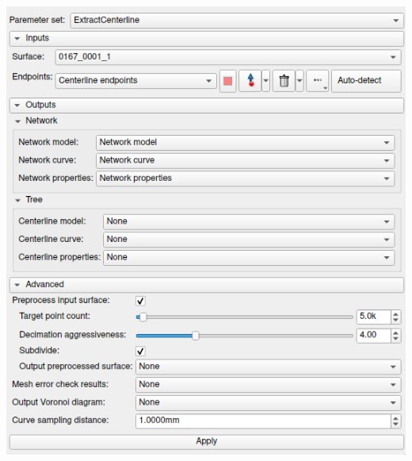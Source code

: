 \documentclass[compress]{beamer}
\begin{document}
\begin{frame}[label=1dge]
\begin{minipage}{\linewidth}
{\begin{minipage}{0.25\linewidth}
				\includegraphics[width=\linewidth]{images/0053_extract2.png}
		\end{minipage}}
\end{minipage}
\end{frame}
\end{document}
